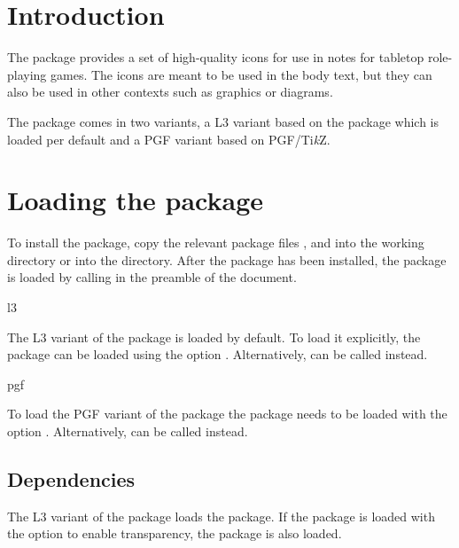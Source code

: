 \documentclass[a4paper]{article}
\begin{document}
\vspace*{-1cm}
\noindent\rpgiconslogo[4]

\bigskip

\printdoctitle

\bigskip

\section{Introduction}

The  package provides a set of high-quality icons for use in notes for tabletop role-playing games. The icons are meant to be used in the body text, but they can also be used in other contexts such as graphics or diagrams.

The package comes in two variants, a L3 variant based on the  package which is loaded per default and a PGF variant based on PGF/Ti\emph{k}Z.

\section{Loading the package}

To install the package, copy the relevant package files ,  and  into the working directory or into the  directory. After the package has been installed, the  package is loaded by calling \macro{\usepackage{rpgicons}} in the preamble of the document. 

\begin{macrodef}l3\end{macrodef}
The L3 variant of the package is loaded by default. To load it explicitly, the package can be loaded using the option . Alternatively, \macro{\usepackage{rpgicons-l3}} can be called instead.

\begin{macrodef}pgf\end{macrodef}
To load the PGF variant of the package the package needs to be loaded with the option . Alternatively, \macro{\usepackage{rpgicons-pgf}} can be called instead.

\subsection{Dependencies}

The L3 variant of the package loads the  package. If the package is loaded with the  option to enable transparency, the  package is also loaded.
\end{document}
